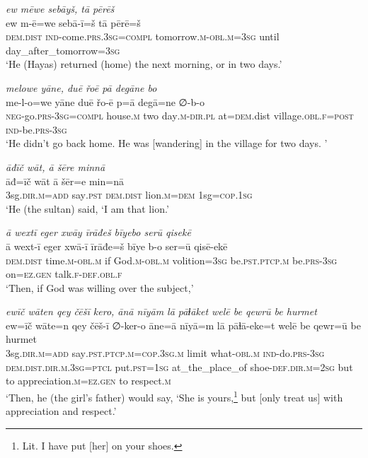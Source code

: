\ea \label{ŽH.107}
\textit{ew mēwe sebāyš, tā pērēš} \\ 
\gll ew m-ē=we sebā-ī=š tā pērē=š \\ 
 \textsc{dem.dist} \textsc{ind-}come\textsc{.prs}\textsc{.3sg}\textsc{=compl} tomorrow\textsc{.m}\textsc{-obl}\textsc{.m}\textsc{=3sg} until day\_after\_tomorrow\textsc{=3sg} \\ 
\glt `He (Hayas) returned (home) the next morning, or in two days.'
\z 
 
\ea \label{ŽH.109}
\textit{melowe yāne, duē řoē pā degāne bo} \\ 
\gll me-l-o=we yāne duē řo-ē p=ā degā=ne ∅-b-o \\ 
 \textsc{neg-}go\textsc{.prs}\textsc{-3sg}\textsc{=compl} house\textsc{.m} two day\textsc{.m}\textsc{-dir}\textsc{.pl} at\textsc{=dem}.dist village\textsc{.obl}\textsc{\textsc{.f}}\textsc{=\textsc{post}} \textsc{ind-}be\textsc{.prs}\textsc{-3sg} \\ 
\glt `He didn’t go back home. He was [wandering] in the village for two days. '
\z 
 
\ea \label{ŽH.116}
\textit{āđīč wāt, ā šēre minnā} \\ 
\gll āđ=īč wāt ā šēr=e min=nā \\ 
 3sg\textsc{.dir}\textsc{.m}\textsc{=add} say\textsc{.pst} \textsc{dem.dist} lion\textsc{.m}\textsc{=dem} 1sg\textsc{=cop}\textsc{.1sg} \\ 
\glt `He (the sultan) said, ‘I am that lion.'
\z 
 
\ea \label{RE.8}
\textit{ā wextī eger xwāy īrāđeš bīyebo serū qisekē} \\ 
\gll ā wext-ī eger xwā-ī īrāđe=š bīye b-o ser=ū qisē-ekē \\ 
 \textsc{dem.dist} time\textsc{.m}\textsc{-obl}\textsc{.m} if God\textsc{.m}\textsc{-obl}\textsc{.m} volition\textsc{=3sg} be\textsc{.pst}\textsc{.ptcp}\textsc{.m} be\textsc{.prs}\textsc{-3sg} on\textsc{\textsc{=ez.gen}} talk\textsc{.f}\textsc{-def}\textsc{.obl}\textsc{.f} \\ 
\glt `Then, if God was willing over the subject,'
\z 
 
\ea \label{RE.10}
\textit{ewīč wāten qey čēšī kero, ānā nīyām lā pāɫāket welē be qewrū be hurmet} \\ 
\gll ew=īč wāte=n qey čēš-ī ∅-ker-o āne=ā nīyā=m lā pāɫā-eke=t welē be qewr=ū be hurmet \\ 
 3sg\textsc{.dir}\textsc{.m}\textsc{=add} say\textsc{.pst}\textsc{.ptcp}\textsc{.m}\textsc{=cop}\textsc{.3sg}\textsc{.m} limit what\textsc{-obl}\textsc{.m} \textsc{ind-}do\textsc{.prs}\textsc{-3sg} \textsc{dem.dist}\textsc{.dir}\textsc{.m}\textsc{.3sg}=\textsc{ptcl} put\textsc{.pst}\textsc{=\textsc{1sg}} at\_the\_place\_of shoe\textsc{-def}\textsc{.dir}\textsc{.m}\textsc{=\textsc{2sg}} but to appreciation\textsc{.m}\textsc{\textsc{=ez.gen}} to respect\textsc{.m} \\ 
\glt `Then, he (the girl’s father) would say, ‘She is yours,\footnote{Lit. I have put [her] on your shoes.} but [only treat us] with appreciation and respect.'
\z 
 

